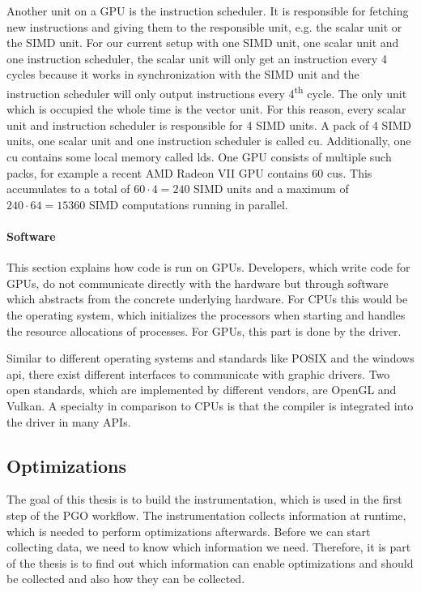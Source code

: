 Another unit on a GPU is the instruction scheduler. It is responsible for fetching new instructions and giving them to the responsible unit, e.g. the scalar unit or the SIMD unit. For our current setup with one SIMD unit, one scalar unit and one instruction scheduler, the scalar unit will only get an instruction every 4 cycles because it works in synchronization with the SIMD unit and the instruction scheduler will only output instructions every 4\textsuperscript{th} cycle. The only unit which is occupied the whole time is the vector unit. For this reason, every scalar unit and instruction scheduler is responsible for 4 SIMD units. A pack of 4 SIMD units, one scalar unit and one instruction scheduler is called \gls{cu}. Additionally, one \gls{cu} contains some local memory called \gls{lds}. One GPU consists of multiple such packs, for example a recent AMD Radeon VII GPU contains 60 \glspl{cu}. This accumulates to a total of $60 \cdot 4 = 240$ SIMD units and a maximum of $240 \cdot 64 = 15360$ SIMD computations running in parallel.

\paragraph{Software} This section explains how code is run on GPUs. Developers, which write code for GPUs, do not communicate directly with the hardware but through software which abstracts from the concrete underlying hardware. For CPUs this would be the operating system, which initializes the processors when starting and handles the resource allocations of processes. For GPUs, this part is done by the driver.

Similar to different operating systems and standards like POSIX and the windows \gls{api}, there exist different interfaces to communicate with graphic drivers. Two open standards, which are implemented by different vendors, are OpenGL and Vulkan. A specialty in comparison to CPUs is that the compiler is integrated into the driver in many APIs.


\subsection{Optimizations}
The goal of this thesis is to build the instrumentation, which is used in the first step of the PGO workflow. The instrumentation collects information at runtime, which is needed to perform optimizations afterwards. Before we can start collecting data, we need to know which information we need. Therefore, it is part of the thesis is to find out which information can enable optimizations and should be collected and also how they can be collected.

